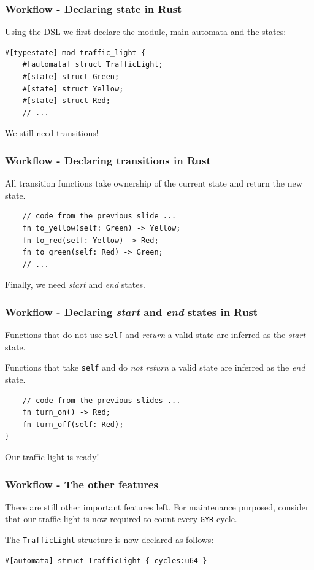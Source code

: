 \documentclass[bigger,notes]{beamer}
\begin{document}
\begin{frame}[fragile]
    \frametitle{Workflow - Declaring state in Rust}
    Using the DSL we first declare the module, main automata and the states:
    \begin{listing}
        \centering
        \begin{verbatim}
#[typestate] mod traffic_light {
    #[automata] struct TrafficLight;
    #[state] struct Green;
    #[state] struct Yellow;
    #[state] struct Red;
    // ...
        \end{verbatim}
    \end{listing}
    We still need transitions!
\end{frame}

\begin{frame}[fragile]
    \frametitle{Workflow - Declaring transitions in Rust}
    All transition functions take ownership of the current state and return the new state.
    \begin{listing}
        \centering
        \begin{verbatim}
    // code from the previous slide ...
    fn to_yellow(self: Green) -> Yellow;
    fn to_red(self: Yellow) -> Red;
    fn to_green(self: Red) -> Green;
    // ...
        \end{verbatim}
    \end{listing}
    Finally, we need \emph{start} and \emph{end} states.
\end{frame}

\begin{frame}[fragile]
    \frametitle{Workflow - Declaring \emph{start} and \emph{end} states in Rust}
    Functions that do not use \texttt{self} and \emph{return} a valid state are inferred as the \emph{start} state.

    Functions that take \texttt{self} and do \emph{not return }a valid state are inferred as the \emph{end} state.
    \begin{listing}
        \centering
        \begin{verbatim}
    // code from the previous slides ...
    fn turn_on() -> Red;
    fn turn_off(self: Red);
}
        \end{verbatim}
    \end{listing}
    Our traffic light is ready!
\end{frame}

\begin{frame}[fragile]
    \frametitle{Workflow - The other features}
    There are still other important features left.
    For maintenance purposed, consider that our traffic light is now required to count every \texttt{GYR} cycle. %

    The \texttt{TrafficLight} structure is now declared as follows:
    \begin{listing}
    \centering
        \begin{verbatim}
#[automata] struct TrafficLight { cycles:u64 }
        \end{verbatim}
    \end{listing}
\end{frame}
\end{document}
